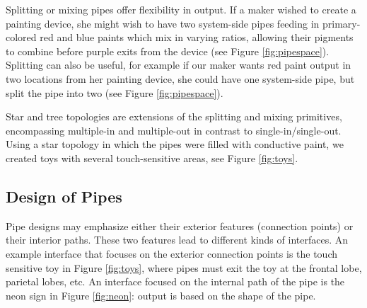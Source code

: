 Splitting or mixing pipes offer flexibility in output.  If a maker wished to create a painting device, she might wish to have two system-side pipes feeding in primary-colored red and blue paints which mix in varying ratios, allowing their pigments to combine before purple exits from the device (see Figure \ref{fig:pipespace}).  Splitting can also be useful, for example if our maker wants red paint output in two locations from her painting device, she could have one system-side pipe, but split the pipe into two (see Figure \ref{fig:pipespace}).

Star and tree topologies are extensions of the splitting and mixing primitives, encompassing multiple-in and multiple-out in contrast to single-in/single-out.  Using a star topology in which the pipes were filled with conductive paint, we created toys with several touch-sensitive areas, see Figure \ref{fig:toys}. 

\subsection{Design of Pipes}

Pipe designs may emphasize either their exterior features (connection points) or their interior paths.  These two features lead to different kinds of interfaces.  An example interface that focuses on the exterior connection points is the touch sensitive toy in Figure \ref{fig:toys}, where pipes must exit the toy at the frontal lobe, parietal lobes, etc.  An interface focused on the internal path of the pipe is the neon sign in Figure \ref{fig:neon}: output is based on the shape of the pipe.